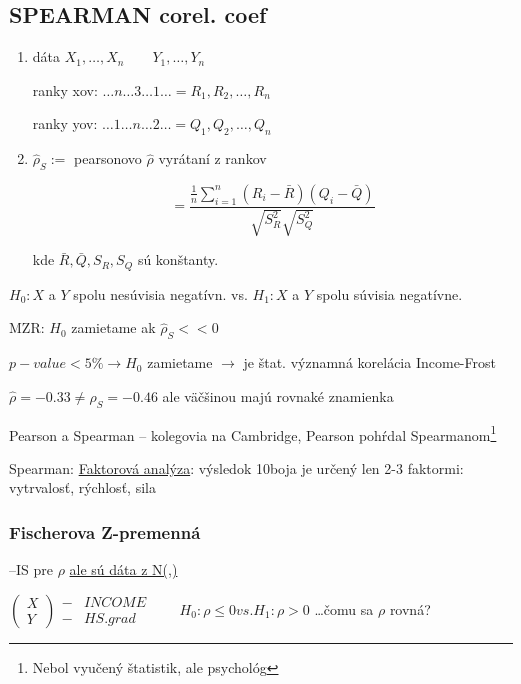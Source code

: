 \documentclass[unknownkeysallowed]{article}
\begin{document}
\subsection*{SPEARMAN corel. coef}
\begin{enumerate}
\item dáta $X_1, \ldots, X_n \qquad Y_1, \ldots, Y_n$

ranky xov: $\ldots n\ldots3\ldots1\ldots = R_1, R_2, \ldots, R_n$

ranky yov: $\ldots1\ldots n\ldots2\ldots = Q_1, Q_2, \ldots, Q_n$
\item $\hat{\rho}_S := $ pearsonovo $\hat{\rho}$ vyrátaní z rankov

$$ = \frac{\frac{1}{n}\sum_{i=1}^n{(R_i-\bar{R})(Q_i-\bar{Q})}}{\sqrt{S_R^2}\sqrt{S_Q^2}}$$

kde $\bar{R}, \bar{Q}, S_R, S_Q$ sú konštanty.
\end{enumerate}

$H_0: X$ a $Y$ spolu nesúvisia negatívn. vs. $H_1: X$ a $Y$ spolu súvisia negatívne.

MZR: $H_0$ zamietame ak $\hat{\rho}_S << 0$

$p-value < 5\% \to H_0$ zamietame $\to$ je štat. významná korelácia Income-Frost

$\hat{\rho} = -0.33 \neq \hat{\rho}_S = -0.46$ ale väčšinou majú rovnaké znamienka

Pearson a Spearman -- kolegovia na Cambridge, Pearson pohŕdal Spearmanom\footnote{Nebol vyučený štatistik, ale psychológ}

Spearman: \underline{Faktorová analýza}: výsledok 10boja je určený len 2-3 faktormi: vytrvalosť, rýchlosť, sila

\subsubsection*{Fischerova Z-premenná}
--IS pre $\rho$ \underline{ale sú dáta z N(,)}

$\left(\begin{matrix}
  X\\
  Y
 \end{matrix}\right)\begin{matrix}
  - & INCOME\\
  - & HS.grad
 \end{matrix} \qquad H_0: \rho \leq 0 vs. H_1: \rho > 0$ \ldots čomu sa $\rho$ rovná?
 
\end{document}
